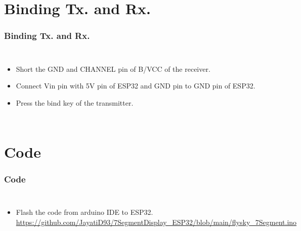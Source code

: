 \documentclass{beamer}
\begin{document}
\section{Binding Tx. and Rx.}
\begin{frame}
\frametitle{Binding Tx. and Rx.}
\begin{columns}

  \begin{itemize}
  \item  Short the GND and CHANNEL pin of B/VCC of the receiver.
  \vspace{10pt}
  \item Connect Vin pin with 5V pin of ESP32 and GND pin to GND pin of ESP32.
  \vspace{10pt}
  \item Press the bind key of the transmitter.
  
  
  \end{itemize}
\end{columns}



\end{frame}

\section{Code}
\begin{frame}
\frametitle{Code}
\begin{columns}

  \begin{itemize}
  \item  Flash the code from arduino IDE to ESP32.\\
  \url{https://github.com/JayatiD93/7SegmentDisplay_ESP32/blob/main/flysky_7Segment.ino}
  
  
  \end{itemize}
  \  
\end{columns}



\end{frame}
\end{document}
